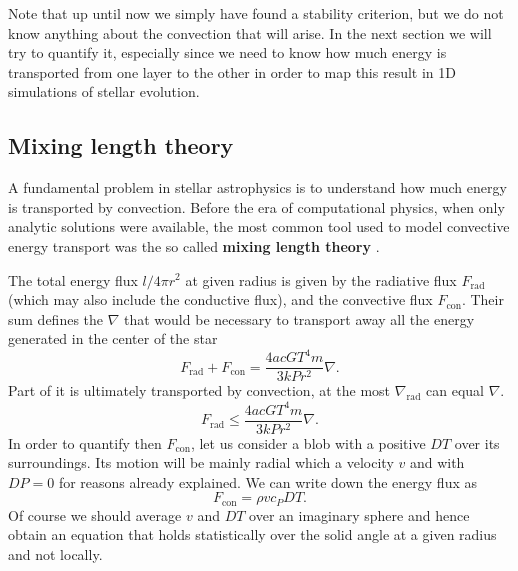 Note that up until now we simply have found a stability criterion, but we do not know anything about the convection that will arise. In the next section we will try to quantify it, especially since we need to know how much energy is transported from one layer to the other in order to map this result in 1D simulations of stellar evolution.

\subsection{Mixing length theory}
A fundamental problem in stellar astrophysics is to understand how much energy is transported by convection. Before the era of computational physics, when only analytic solutions were available, the most common tool used to model convective energy transport was the so called \textbf{mixing length theory} \citet{bohm}. 

The total energy flux $l/4 \pi r^2$ at given radius is given by the radiative flux $F_{\mathrm{rad}}$ (which may also include the conductive flux), and the convective flux $F_{\mathrm{con}}$. Their sum defines the $\nabla$ that would be necessary to transport away all the energy generated in the center of the star
\begin{equation}\label{7.1}
F_{\mathrm{rad}}+ F_{\mathrm{con}}= \frac{4 a c G T^4 m }{3 k P r^2} \nabla.
\end{equation}
Part of it is ultimately transported by convection, at the most $\nabla_{\mathrm{rad}}$ can equal $\nabla$.
\begin{equation}\label{7.2}
F_{\mathrm{rad}} \leq \frac{4 a c G T^4 m}{3 k P r^2} \nabla.
\end{equation}
In order to quantify then $F_{\mathrm{con}}$, let us consider a blob with a positive $DT$ over its surroundings. Its motion will be mainly radial which a velocity $v$ and with $DP=0$ for reasons already explained. We can write down the energy flux as
\begin{equation}\label{fconv}
	F_{\mathrm{con}}=\rho  v  c_P  DT.
\end{equation}
Of course we should average $v$ and $DT$ over an imaginary sphere and hence obtain an equation that holds statistically over the solid angle at a given radius and not locally. 

